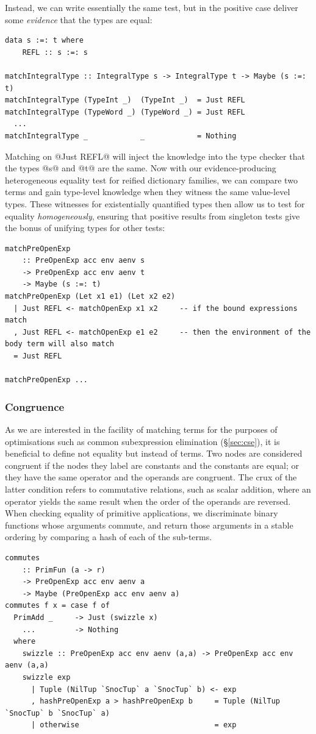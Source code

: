 Instead, we can write essentially the same test, but in the positive case
deliver some \emph{evidence} that the types are equal:
%
\begin{lstlisting}[style=haskell]
data s :=: t where
    REFL :: s :=: s

matchIntegralType :: IntegralType s -> IntegralType t -> Maybe (s :=: t)
matchIntegralType (TypeInt _)  (TypeInt _)  = Just REFL
matchIntegralType (TypeWord _) (TypeWord _) = Just REFL
  ...
matchIntegralType _            _            = Nothing
\end{lstlisting}
%
Matching on @Just REFL@ will inject the knowledge into the type
checker that the types @s@ and @t@ are the same. Now with our
evidence-producing heterogeneous equality test for reified dictionary families,
we can compare two terms and gain type-level knowledge when they witness the
same value-level types. These witnesses for existentially quantified types then
allow us to test for equality \emph{homogeneously}, ensuring that positive
results from singleton tests give the bonus of unifying types for other tests:
%
\begin{lstlisting}[style=haskell]
matchPreOpenExp
    :: PreOpenExp acc env aenv s
    -> PreOpenExp acc env aenv t
    -> Maybe (s :=: t)
matchPreOpenExp (Let x1 e1) (Let x2 e2)
  | Just REFL <- matchOpenExp x1 x2     -- if the bound expressions match
  , Just REFL <- matchOpenExp e1 e2     -- then the environment of the body term will also match
  = Just REFL

matchPreOpenExp ...
\end{lstlisting}


\subsubsection{Congruence}

As we are interested in the facility of matching terms for the purposes of
optimisations such as common subexpression elimination (\S\ref{sec:cse}), it is
beneficial to define not equality but instead  of terms. Two
nodes are considered congruent if the nodes they label are constants and the
constants are equal; or they have the same operator and the operands are
congruent. The crux of the latter condition refers to commutative relations,
such as scalar addition, where an operator yields the same result when the order
of the operands are reversed. When checking equality of primitive applications,
we discriminate binary functions whose arguments commute, and return those
arguments in a stable ordering by comparing a hash of each of the sub-terms.
%
\begin{lstlisting}[style=haskell]
commutes
    :: PrimFun (a -> r)
    -> PreOpenExp acc env aenv a
    -> Maybe (PreOpenExp acc env aenv a)
commutes f x = case f of
  PrimAdd _     -> Just (swizzle x)
    ...         -> Nothing
  where
    swizzle :: PreOpenExp acc env aenv (a,a) -> PreOpenExp acc env aenv (a,a)
    swizzle exp
      | Tuple (NilTup `SnocTup` a `SnocTup` b) <- exp
      , hashPreOpenExp a > hashPreOpenExp b     = Tuple (NilTup `SnocTup` b `SnocTup` a)
      | otherwise                               = exp
\end{lstlisting}


